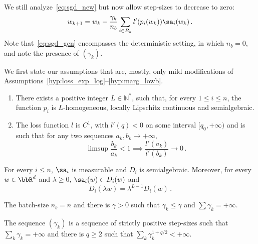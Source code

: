 We still analyze~\eqref{eq:sgd_new} but now allow step-sizes to decrease to zero:
\begin{equation}\label{eq:sgd_gen}
  w_{k+1} = w_k -  \frac{\gamma_k}{n_b}\sum_{i\in B_k} l'(p_i(w_k)) \sa_i(w_k)\, .
\end{equation}
Note that~\eqref{eq:sgd_gen} encompasses the deterministic setting, in which $n_b = 0$, and note the presence of $(\gamma_k)$.

We first state our assumptions that are, mostly, only mild modifications of Assumptions~\ref{hyp:loss_exp_log}--\ref{hyp:marg_lowb}.
\begin{assumption}\label{Hgen:loss}\phantom{=}
  \begin{enumerate}[label=\roman*)]
    \item There exists a positive integer $L \in \mathbb{N}^*$,  such that, for every $1 \leq i \leq n$, the function $p_i$ is $L$-homogeneous, locally Lipschitz continuous and semialgebraic.
    \item\label{Hgen:loss_gen} The loss function $l$ is $C^1$, with $l'(q) <0$ on some interval $[q_0, + \infty)$ and is such that for any two sequences $a_k,b_k \rightarrow + \infty$,
    \begin{equation*}
        \limsup \frac{b_k}{a_k}< 1 \implies \frac{l'(a_k)}{l'(b_k)} \rightarrow 0 \, .
    \end{equation*}
  \end{enumerate}
\end{assumption}

\begin{assumption}\phantom{=}\label{Hgen:cons}
  For every $i \leq n$, $\sa_i$ is measurable and $D_i$ is semialgebraic. Moreover, for every $w \in \bbR^d$ and $\lambda \geq 0$, $\sa_i(w)  \in D_i(w)$ and
  \begin{equation*}
    D_i(\lambda w) = \lambda^{L-1} D_i(w)\, .
  \end{equation*}
\end{assumption}


\begin{assumption}\label{Hgen:det}
  The batch-size $n_b = n$ and there is $\gamma>0$ such that $\gamma_k \leq \gamma$ and $\sum \gamma_k = + \infty$.
\end{assumption}
\begin{assumption}\label{Hgen:sto}
 The sequence $(\gamma_k)$ is a sequence of strictly positive step-sizes such that $\sum_{k} \gamma_k = + \infty$ and there is $q \geq 2$ such that $\sum_{k} \gamma_k^{1+q/2} < + \infty$.
\end{assumption}

